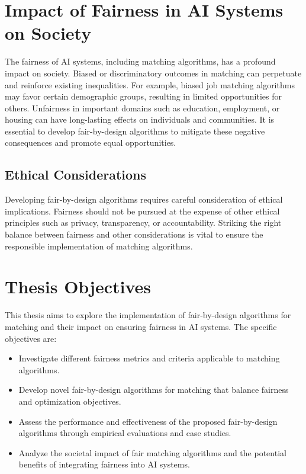 \documentclass[12pt,a4paper,openright,twoside]{book}
\begin{document}
\section{Impact of Fairness in AI Systems on Society}
The fairness of AI systems, including matching algorithms, has a profound impact on society. Biased or discriminatory outcomes in matching can perpetuate and reinforce existing inequalities. For example, biased job matching algorithms may favor certain demographic groups, resulting in limited opportunities for others. Unfairness in important domains such as education, employment, or housing can have long-lasting effects on individuals and communities. It is essential to develop fair-by-design algorithms to mitigate these negative consequences and promote equal opportunities.

\subsection{Ethical Considerations}
Developing fair-by-design algorithms requires careful consideration of ethical implications. Fairness should not be pursued at the expense of other ethical principles such as privacy, transparency, or accountability. Striking the right balance between fairness and other considerations is vital to ensure the responsible implementation of matching algorithms.

\section{Thesis Objectives}
This thesis aims to explore the implementation of fair-by-design algorithms for matching and their impact on ensuring fairness in AI systems. The specific objectives are:

\begin{itemize}
    \item Investigate different fairness metrics and criteria applicable to matching algorithms.
    \item Develop novel fair-by-design algorithms for matching that balance fairness and optimization objectives.
    \item Assess the performance and effectiveness of the proposed fair-by-design algorithms through empirical evaluations and case studies.
    \item Analyze the societal impact of fair matching algorithms and the potential benefits of integrating fairness into AI systems.
\end{itemize}
\end{document}
